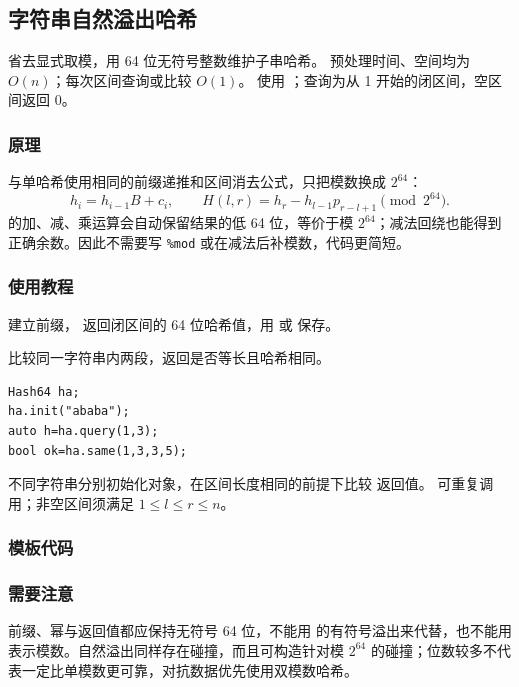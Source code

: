 \subsection{字符串自然溢出哈希}
\label{algo:string-hash-overflow}
\AlgorithmInfo
    {省去显式取模，用 64 位无符号整数维护子串哈希。}
    {预处理时间、空间均为 $O(n)$；每次区间查询或比较 $O(1)$。}
    {使用 ；查询为从 1 开始的闭区间，空区间返回 0。}
\subsubsection*{原理}
与单哈希使用相同的前缀递推和区间消去公式，只把模数换成 $2^{64}$：
\[
    h_i=h_{i-1}B+c_i,\qquad
    H(l,r)=h_r-h_{l-1}p_{r-l+1}\pmod{2^{64}}.
\]
 的加、减、乘运算会自动保留结果的低 64 位，等价于模 $2^{64}$；减法回绕也能得到正确余数。因此不需要写 \texttt{\%mod} 或在减法后补模数，代码更简短。
\subsubsection*{使用教程}
 建立前缀， 返回闭区间的 64 位哈希值，用  或  保存。

 比较同一字符串内两段，返回是否等长且哈希相同。
\begin{lstlisting}[style=mtycpp,numbers=none]
Hash64 ha;
ha.init("ababa");
auto h=ha.query(1,3);
bool ok=ha.same(1,3,3,5);
\end{lstlisting}
不同字符串分别初始化对象，在区间长度相同的前提下比较  返回值。 可重复调用；非空区间须满足 $1\le l\le r\le n$。
\subsubsection*{模板代码}
\subsubsection*{需要注意}
前缀、幂与返回值都应保持无符号 64 位，不能用  的有符号溢出来代替，也不能用  表示模数。自然溢出同样存在碰撞，而且可构造针对模 $2^{64}$ 的碰撞；位数较多不代表一定比单模数更可靠，对抗数据优先使用双模数哈希。

